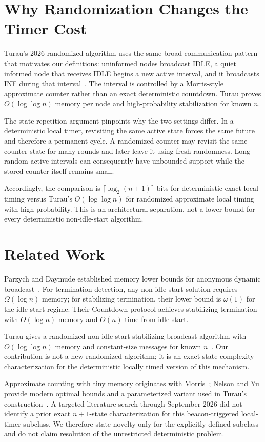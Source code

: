 \documentclass[11pt]{article}
\begin{document}
\section{Why Randomization Changes the Timer Cost}
Turau's 2026 randomized algorithm uses the same broad communication pattern that motivates our definitions: uninformed nodes broadcast IDLE, a quiet informed node that receives IDLE begins a new active interval, and it broadcasts INF during that interval~\cite{turau2026broadcasts}. The interval is controlled by a Morris-style approximate counter rather than an exact deterministic countdown. Turau proves $O(\log\log n)$ memory per node and high-probability stabilization for known $n$.

The state-repetition argument pinpoints why the two settings differ. In a deterministic local timer, revisiting the same active state forces the same future and therefore a permanent cycle. A randomized counter may revisit the same counter state for many rounds and later leave it using fresh randomness. Long random active intervals can consequently have unbounded support while the stored counter itself remains small.

Accordingly, the comparison is $\lceil\log_2(n+1)\rceil$ bits for deterministic exact local timing versus Turau's $O(\log\log n)$ for randomized approximate local timing with high probability. This is an architectural separation, not a lower bound for every deterministic non-idle-start algorithm.

\section{Related Work}
Parzych and Daymude established memory lower bounds for anonymous dynamic broadcast~\cite{parzych2024memory,parzych2026memory}. For termination detection, any non-idle-start solution requires $\Omega(\log n)$ memory; for stabilizing termination, their lower bound is $\omega(1)$ for the idle-start regime. Their Countdown protocol achieves stabilizing termination with $O(\log n)$ memory and $O(n)$ time from idle start.

Turau gives a randomized non-idle-start stabilizing-broadcast algorithm with $O(\log\log n)$ memory and constant-size messages for known $n$~\cite{turau2026broadcasts}. Our contribution is not a new randomized algorithm; it is an exact state-complexity characterization for the deterministic locally timed version of this mechanism.

Approximate counting with tiny memory originates with Morris~\cite{morris1978counting}; Nelson and Yu provide modern optimal bounds and a parameterized variant used in Turau's construction~\cite{nelson2022optimal}. A targeted literature search through September 2026 did not identify a prior exact $n+1$-state characterization for this beacon-triggered local-timer subclass. We therefore state novelty only for the explicitly defined subclass and do not claim resolution of the unrestricted deterministic problem.
\end{document}
